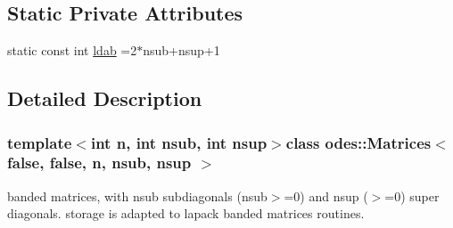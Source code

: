 \subsection*{Static Private Attributes}
\begin{DoxyCompactItemize}
\item 
static const int \hyperlink{classodes_1_1Matrices_3_01false_00_01false_00_01n_00_01nsub_00_01nsup_01_4_a8064440c208443dcb24a817ff763037e}{ldab} =2$\ast$nsub+nsup+1
\end{DoxyCompactItemize}


\subsection{Detailed Description}
\subsubsection*{template$<$int n, int nsub, int nsup$>$class odes\-::\-Matrices$<$ false, false, n, nsub, nsup $>$}

banded matrices, with nsub subdiagonals (nsub$>$=0) and nsup ($>$=0) super diagonals. storage is adapted to lapack banded matrices routines. 

